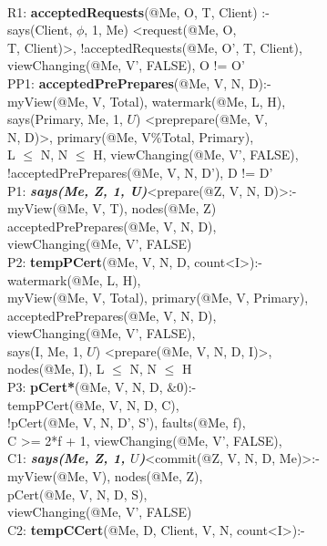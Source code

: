 \begin{code}
\\
R1: \textbf{acceptedRequests}(@Me, O, T, Client) :- \\
\> says(Client, $\phi$, 1, Me) <request(@Me, O, \\
\> T, Client)>, !acceptedRequests(@Me, O', T, Client),\\
\> viewChanging(@Me, V', FALSE), O != O'\\
PP1: \textbf{acceptedPrePrepares}(@Me, V, N, D):-\\
\> myView(@Me, V, Total), watermark(@Me, L, H), \\
\> says(Primary, Me, 1, $U$) <preprepare(@Me, V,\\
\>  N, D)>, primary(@Me, V\%Total, Primary),\\
\> L $\leq$ N, N $\leq$ H, viewChanging(@Me, V', FALSE),\\
\> !acceptedPrePrepares(@Me, V, N, D'), D != D'\\
P1: \textbf{\textit{says(Me, Z, 1, U)}}<prepare(@Z, V, N, D)>:-\\
\> myView(@Me, V, T), nodes(@Me, Z)\\
\> acceptedPrePrepares(@Me, V, N, D),\\
\> viewChanging(@Me, V', FALSE)\\
P2: \textbf{tempPCert}(@Me, V, N, D, count<I>):- \\
\> watermark(@Me, L, H), \\
\> myView(@Me, V, Total), primary(@Me, V, Primary), \\
\> acceptedPrePrepares(@Me, V, N, D), \\
\> viewChanging(@Me, V', FALSE),\\
\> says(I, Me, 1, $U$) <prepare(@Me, V, N, D, I)>, \\
\> nodes(@Me, I), L $\leq$ N, N $\leq$ H\\
P3: \textbf{pCert*}(@Me, V, N, D, $\&0$):- \\
\> tempPCert(@Me, V, N, D, C), \\
\> !pCert(@Me, V, N, D', S'), faults(@Me, f), \\
\> C >= 2*f + 1, viewChanging(@Me, V', FALSE),\\
C1: \textbf{\textit{says(Me, Z, 1, $U$)}}<commit(@Z, V, N, D, Me)>:- \\
\> myView(@Me, V), nodes(@Me, Z), \\
\> pCert(@Me, V, N, D, S), \\
\> viewChanging(@Me, V', FALSE)\\
C2: \textbf{tempCCert}(@Me, D, Client, V, N, count<I>):-\\

\end{code}
